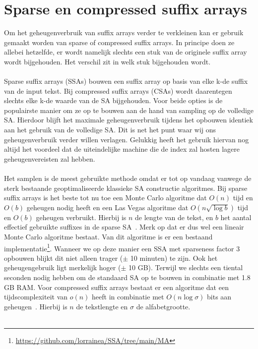 \section{Sparse en compressed suffix arrays}\label{sec:sparse-en-compressed-suffix-arrays}
Om het geheugenverbruik van suffix arrays verder te verkleinen kan er gebruik gemaakt worden van sparse of compressed suffix arrays.
In principe doen ze allebei hetzelfde, er wordt namelijk slechts een stuk van de originele suffix array wordt bijgehouden.
Het verschil zit in welk stuk bijgehouden wordt.
\\ \\
Sparse suffix arrays (SSAs) bouwen een suffix array op basis van elke k-de suffix van de input tekst.
Bij compressed suffix arrays (CSAs) wordt daarentegen slechts elke k-de waarde van de SA bijgehouden.
Voor beide opties is de populairste manier om ze op te bouwen aan de hand van sampling op de volledige SA\@.
Hierdoor blijft het maximale geheugenverbruik tijdens het opbouwen identiek aan het gebruik van de volledige SA\@.
Dit is net het punt waar wij ons geheugenverbruik verder willen verlagen.
Gelukkig heeft het gebruik hiervan nog altijd het voordeel dat de uiteindelijke machine die de index zal hosten lagere geheugenvereisten zal hebben.
\\ \\
Het samplen is de meest gebruikte methode omdat er tot op vandaag vanwege de sterk bestaande geoptimaliseerde klassieke SA constructie algoritmes.
Bij sparse suffix arrays is het beste tot nu toe een Monte Carlo algoritme dat $O(n)$ tijd en $O(b)$ geheugen nodig heeft en een Las Vegas algoritme dat $O(n \sqrt{\log b})$ tijd en $O(b)$ geheugen verbruikt.
Hierbij is $n$ de lengte van de tekst, en $b$ het aantal effectief gebruikte suffixes in de sparse SA~\cite{building_sparse_sa}.
Merk op dat er dus wel een lineair Monte Carlo algoritme bestaat.
Van dit algoritme is er een bestaand implementatie\footnote{\url{https://github.com/lorrainea/SSA/tree/main/MA}}.
Wanneer we op deze manier een SSA met sparseness factor 3 opbouwen blijkt dit niet alleen trager ($\pm$ 10 minuten) te zijn.
Ook het geheugengebruik ligt merkelijk hoger ($\pm$ 10 GB).
Terwijl we slechts een tiental seconden nodig hebben om de standaard SA op te bouwen in combinatie met 1.8 GB RAM\@.
Voor compressed suffix arrays bestaat er een algoritme dat een tijdscomplexiteit van $o(n)$ heeft in combinatie met $O(n \log \sigma)$ bits aan geheugen~\cite{building_compressed_sa}.
Hierbij is $n$ de tekstlengte en $\sigma$ de alfabetgrootte.
\\ \\
